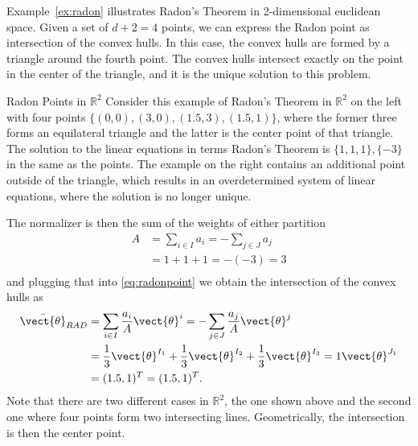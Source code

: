 Example~\ref{ex:radon} illustrates Radon's Theorem in 2-dimensional euclidean space.
Given a set of $d+2 =4$ points, we can express the Radon point as intersection of the convex hulls.
In this case, the convex hulls are formed by a triangle around the fourth point.
The convex hulls intersect exactly on the point in the center of the triangle, and it is the unique solution to this problem.

\begin{example}{Radon Points in $\mathbb{R}^2$}
    \label{ex:radon}
    Consider this example of Radon's Theorem in $\mathbb{R}^2$ on the left with four points $\{(0,0), (3,0), (1.5, 3), (1.5,1)\}$, where the former three forms an equilateral triangle and the latter is the center point of that triangle.
    The solution to the linear equations in terms Radon's Theorem is $\{1,1,1\},\{-3\}$ in the same as the points. 
    The example on the right contains an additional point outside of the triangle, which results in an overdetermined system of linear equations, where the solution is no longer unique.
    
     
    The normalizer is then the sum of the weights of either partition
    \begin{equation}
        \begin{split}
            A &= \sum_{i\in I} a_i = - \sum_{j \in J} a_j \\
            &= 1 + 1 + 1 = -(-3) = 3 \\
        \end{split}
    \end{equation}
    and plugging that into \autoref{eq:radonpoint} we obtain the intersection of the convex hulls as
    \begin{equation}
        \begin{split}
            \bar{\vect{\theta}}_{RAD} &= \sum_{i\in I} \frac{a_i}{A} \vect{\theta}^i = - \sum_{j \in J} \frac{a_j}{A} \vect{\theta}^j \\
            &= \frac{1}{3} \vect{\theta}^{I_1} + \frac{1}{3} \vect{\theta}^{I_2} + \frac{1}{3} \vect{\theta}^{I_3} = 1 \vect{\theta}^{J_1} \\
            & =  (1.5, 1)^T = (1.5, 1)^T.
        \end{split}
    \end{equation}
    Note that there are two different cases in $\mathbb{R}^2$, the one shown above and the second one where four points form two intersecting lines. Geometrically, the intersection is then the center point.

\end{example}
   

